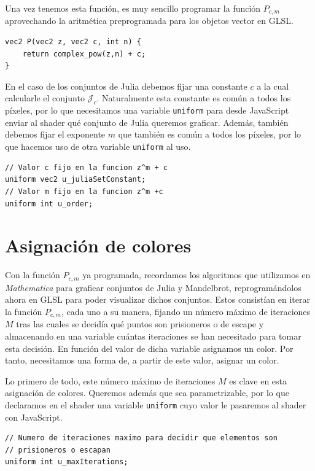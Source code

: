 Una vez tenemos esta función, es muy sencillo programar la función $P_{c,m}$ aprovechando la aritmética preprogramada para los objetos vector en GLSL.

\begin{lstlisting}
vec2 P(vec2 z, vec2 c, int n) {
	return complex_pow(z,n) + c;
}
\end{lstlisting}

En el caso de los conjuntos de Julia debemos fijar una constante $c$ a la cual calcularle el conjunto $\mathcal{J}_c$. Naturalmente esta constante es común a todos los píxeles, por lo que necesitamos una variable \verb|uniform| para desde JavaScript enviar al shader qué conjunto de Julia queremos graficar. Además, también debemos fijar el exponente $m$ que también es común a todos los píxeles, por lo que hacemos uso de otra variable \verb|uniform| al uso.

\begin{lstlisting}
// Valor c fijo en la funcion z^m + c
uniform vec2 u_juliaSetConstant;
// Valor m fijo en la funcion z^m +c
uniform int u_order;
\end{lstlisting}

\section{Asignación de colores}
\label{section:colores}

Con la función $P_{c,m}$ ya programada, recordamos los algoritmos que utilizamos en \textit{Mathematica} para graficar conjuntos de Julia y Mandelbrot, reprogramándolos ahora en GLSL para poder visualizar dichos conjuntos. Estos consistían en iterar la función $P_{c,m}$, cada uno a su manera, fijando un número máximo de iteraciones $M$ tras las cuales se decidía qué puntos son prisioneros o de escape y almacenando en una variable cuántas iteraciones se han necesitado para tomar esta decisión. En función del valor de dicha variable asignamos un color. Por tanto, necesitamos una forma de, a partir de este valor, asignar un color.

Lo primero de todo, este número máximo de iteraciones $M$ es clave en esta asignación de colores. Queremos además que sea parametrizable, por lo que declaramos en el shader una variable \verb|uniform| cuyo valor le pasaremos al shader con JavaScript.

\begin{lstlisting}
// Numero de iteraciones maximo para decidir que elementos son
// prisioneros o escapan
uniform int u_maxIterations;
\end{lstlisting}

